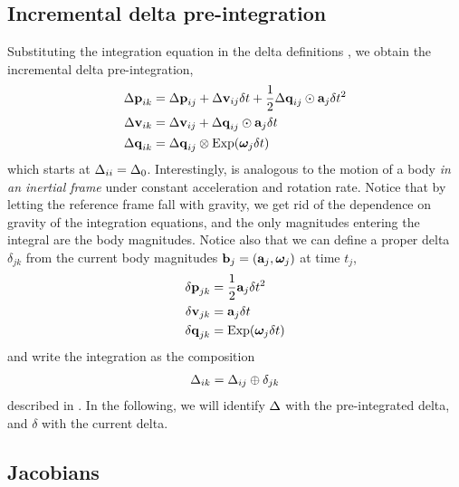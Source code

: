 \subsection{Incremental delta pre-integration}

Substituting the integration equation  in the delta definitions , we obtain the incremental delta pre-integration,
%
\begin{align}\label{equ:g_second_order_pre-integration}
\begin{split}
{\Delta{\bf p}}_{ik} 
&= {\Delta{\bf p}}_{ij} + {\Delta{\bf v}}_{ij}\delta t + \frac12{\Delta{\bf q}}_{ij}\odot{\bf a}_j\delta t^2 \\
{\Delta{\bf v}}_{ik} 
&= {\Delta{\bf v}}_{ij} + {\Delta{\bf q}}_{ij}\odot{\bf a}_j\delta t \\
{\Delta{\bf q}}_{ik} 
&= {\Delta{\bf q}}_{ij}\otimes\operatorname*{Exp}({{\bm \omega}}_j\delta t) 
\end{split}
\end{align}
%
which starts at $\Delta_{ii}=\Delta_0$. Interestingly,  is analogous to the motion of a body \emph{in an inertial frame} under constant acceleration and rotation rate.
Notice that by letting the reference frame fall with gravity, we get rid of the dependence on gravity of the integration equations, and the only magnitudes entering the integral are the body magnitudes.
Notice also that we can define a proper delta $\delta_{jk}$ from the current body magnitudes ${\bf b}_j=({\bf a}_j,{{\bm \omega}}_j)$ at time $t_j$,
%
\begin{align}\label{equ:delta_creation}
\begin{split}
{\delta{\bf p}}_{jk} &= \frac12{\bf a}_j\delta t^2 \\
{\delta{\bf v}}_{jk} &= {\bf a}_j\delta t \\
{\delta{\bf q}}_{jk} &= \operatorname*{Exp}({{\bm \omega}}_j\delta t)
\end{split}
\end{align}
%
and write the integration  as the composition 
%
\begin{align}\label{equ:composition_compact}
\Delta_{ik}=\Delta_{ij}\oplus\delta_{jk}
\end{align}
%
described in . In the following, we will identify $\Delta$ with the pre-integrated delta, and $\delta$ with the current delta.


\subsection{Jacobians}

